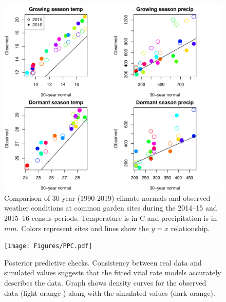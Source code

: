 \documentclass[12pt]{article}\usepackage[]{graphicx}\usepackage[dvipsnames]{xcolor}
\begin{document}
\begin{figure}[H]
	\centering
	\includegraphics[width=0.959\linewidth]{Figures/clim_norm_vs_weather.pdf}
	\caption{Comparison of 30-year (1990-2019) climate normals and observed weather conditions at common garden sites during the 2014--15 and 2015--16 census periods. Temperature is in \degree C and precipitation is in $mm$. Colors represent sites and lines show the $y=x$ relationship.}
	\label{Sup:climate_normal_weather}
\end{figure}

\begin{figure}[H]
	\centering
	\texttt{[image: Figures/PPC.pdf]}
	\caption{Posterior predictive checks. Consistency between real data and simulated values suggests that the fitted vital rate models accurately describes the data. Graph shows density curves for the observed data (light orange ) along with the simulated values (dark orange).}
	\label{Sup:PPC}
\end{figure}
\end{document}
